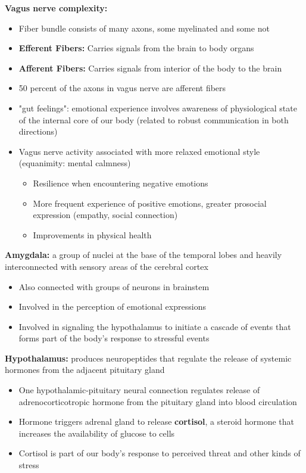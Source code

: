 \documentclass{article}
\begin{document}
\noindent \textbf{Vagus nerve complexity:} 
\begin{itemize}
    \item Fiber bundle consists of many axons, some myelinated and some not
    \item \textbf{Efferent Fibers:} Carries signals from the brain to body organs 
    \item \textbf{Afferent Fibers:} Carries signals from interior of the body to the brain
    \item 50 percent of the axons in vagus nerve are afferent fibers
    \item "gut feelings": emotional experience involves awareness of physiological state of the internal core of our body (related to robust communication in both directions)
    \item Vagus nerve activity associated with more relaxed emotional style (equanimity: mental calmness)
    \begin{itemize}
        \item Resilience when encountering negative emotions
        \item More frequent experience of positive emotions, greater prosocial expression (empathy, social connection) 
        \item Improvements in physical health
    \end{itemize}
\end{itemize}

\noindent \textbf{Amygdala:} a group of nuclei at the base of the temporal lobes and heavily interconnected with sensory areas of the cerebral cortex
\begin{itemize}
    \item Also connected with  groups of neurons in brainstem
    \item Involved in the perception of emotional expressions
    \item Involved in signaling the hypothalamus to initiate a cascade of events that forms part of the body's response to stressful events
\end{itemize}

\noindent\textbf{Hypothalamus:} produces neuropeptides that regulate the release of systemic hormones from the adjacent pituitary gland
\begin{itemize}
    \item One hypothalamic-pituitary neural connection regulates release of adrenocorticotropic hormone from the pituitary gland into blood circulation
    \item Hormone triggers adrenal gland to release \textbf{cortisol}, a steroid hormone that increases the availability of glucose to cells
    \item Cortisol is part of our body's response to perceived threat and other kinds of stress
\end{itemize}
\end{document}
